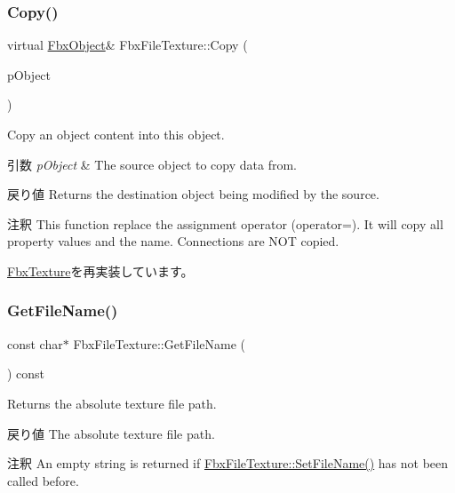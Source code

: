 \subsubsection{\texorpdfstring{Copy()}{Copy()}}
{\footnotesize\ttfamily virtual \hyperlink{class_fbx_object}{Fbx\+Object}\& Fbx\+File\+Texture\+::\+Copy (\begin{DoxyParamCaption}\item[{const \hyperlink{class_fbx_object}{Fbx\+Object} \&}]{p\+Object }\end{DoxyParamCaption})\hspace{0.3cm}{\ttfamily [virtual]}}

Copy an object content into this object. 
\begin{DoxyParams}{引数}
{\em p\+Object} & The source object to copy data from. \\
\hline
\end{DoxyParams}
\begin{DoxyReturn}{戻り値}
Returns the destination object being modified by the source. 
\end{DoxyReturn}
\begin{DoxyRemark}{注釈}
This function replace the assignment operator (operator=). It will copy all property values and the name. Connections are N\+OT copied. 
\end{DoxyRemark}


\hyperlink{class_fbx_texture_a321c23c2dc2e91c58e2fcc2ed7d29f9e}{Fbx\+Texture}を再実装しています。

\mbox{\label{class_fbx_file_texture_ae8b7a59e5d2787e9ca1aa4f3f1d2c7cf}} 
\subsubsection{\texorpdfstring{Get\+File\+Name()}{GetFileName()}}
{\footnotesize\ttfamily const char$\ast$ Fbx\+File\+Texture\+::\+Get\+File\+Name (\begin{DoxyParamCaption}{ }\end{DoxyParamCaption}) const}

Returns the absolute texture file path. \begin{DoxyReturn}{戻り値}
The absolute texture file path. 
\end{DoxyReturn}
\begin{DoxyRemark}{注釈}
An empty string is returned if \hyperlink{class_fbx_file_texture_a82e450fd46559fc4c78ca6f0d593b837}{Fbx\+File\+Texture\+::\+Set\+File\+Name()} has not been called before. 
\end{DoxyRemark}
\mbox{\label{class_fbx_file_texture_a5eee84efb4b82ad7270ac95a7ca9a5ca}} 
